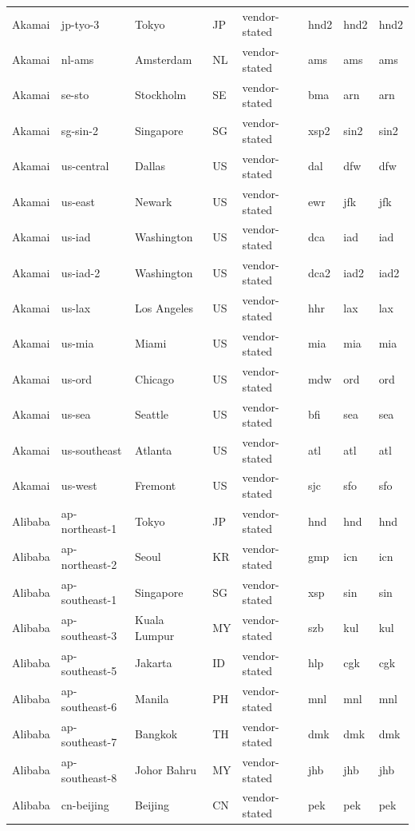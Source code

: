 \begin{longtable}{llllllll}
Akamai & jp-tyo-3 & Tokyo & JP & vendor-stated & hnd2 & hnd2 & hnd2 \\
Akamai & nl-ams & Amsterdam & NL & vendor-stated & ams & ams & ams \\
Akamai & se-sto & Stockholm & SE & vendor-stated & bma & arn & arn \\
Akamai & sg-sin-2 & Singapore & SG & vendor-stated & xsp2 & sin2 & sin2 \\
Akamai & us-central & Dallas & US & vendor-stated & dal & dfw & dfw \\
Akamai & us-east & Newark & US & vendor-stated & ewr & jfk & jfk \\
Akamai & us-iad & Washington & US & vendor-stated & dca & iad & iad \\
Akamai & us-iad-2 & Washington & US & vendor-stated & dca2 & iad2 & iad2 \\
Akamai & us-lax & Los Angeles & US & vendor-stated & hhr & lax & lax \\
Akamai & us-mia & Miami & US & vendor-stated & mia & mia & mia \\
Akamai & us-ord & Chicago & US & vendor-stated & mdw & ord & ord \\
Akamai & us-sea & Seattle & US & vendor-stated & bfi & sea & sea \\
Akamai & us-southeast & Atlanta & US & vendor-stated & atl & atl & atl \\
Akamai & us-west & Fremont & US & vendor-stated & sjc & sfo & sfo \\
Alibaba & ap-northeast-1 & Tokyo & JP & vendor-stated & hnd & hnd & hnd \\
Alibaba & ap-northeast-2 & Seoul & KR & vendor-stated & gmp & icn & icn \\
Alibaba & ap-southeast-1 & Singapore & SG & vendor-stated & xsp & sin & sin \\
Alibaba & ap-southeast-3 & Kuala Lumpur & MY & vendor-stated & szb & kul & kul \\
Alibaba & ap-southeast-5 & Jakarta & ID & vendor-stated & hlp & cgk & cgk \\
Alibaba & ap-southeast-6 & Manila & PH & vendor-stated & mnl & mnl & mnl \\
Alibaba & ap-southeast-7 & Bangkok & TH & vendor-stated & dmk & dmk & dmk \\
Alibaba & ap-southeast-8 & Johor Bahru & MY & vendor-stated & jhb & jhb & jhb \\
Alibaba & cn-beijing & Beijing & CN & vendor-stated & pek & pek & pek \\

\end{longtable}
